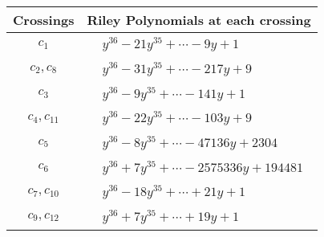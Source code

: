 \documentclass[1p]{elsarticle_modified}
\theoremstyle{definition}
\begin{document}
\begin{tabular}{m{50pt}|m{274pt}}
Crossings & \hspace{64pt}Riley Polynomials at each crossing \\
\hline $$\begin{aligned}c_{1}\end{aligned}$$&$\begin{aligned}
&y^{36}-21 y^{35}+\cdots-9 y+1
\end{aligned}$\\
\hline $$\begin{aligned}c_{2},c_{8}\end{aligned}$$&$\begin{aligned}
&y^{36}-31 y^{35}+\cdots-217 y+9
\end{aligned}$\\
\hline $$\begin{aligned}c_{3}\end{aligned}$$&$\begin{aligned}
&y^{36}-9 y^{35}+\cdots-141 y+1
\end{aligned}$\\
\hline $$\begin{aligned}c_{4},c_{11}\end{aligned}$$&$\begin{aligned}
&y^{36}-22 y^{35}+\cdots-103 y+9
\end{aligned}$\\
\hline $$\begin{aligned}c_{5}\end{aligned}$$&$\begin{aligned}
&y^{36}-8 y^{35}+\cdots-47136 y+2304
\end{aligned}$\\
\hline $$\begin{aligned}c_{6}\end{aligned}$$&$\begin{aligned}
&y^{36}+7 y^{35}+\cdots-2575336 y+194481
\end{aligned}$\\
\hline $$\begin{aligned}c_{7},c_{10}\end{aligned}$$&$\begin{aligned}
&y^{36}-18 y^{35}+\cdots+21 y+1
\end{aligned}$\\
\hline $$\begin{aligned}c_{9},c_{12}\end{aligned}$$&$\begin{aligned}
&y^{36}+7 y^{35}+\cdots+19 y+1
\end{aligned}$\\
\hline
\end{tabular}\\~\\
\end{document}
